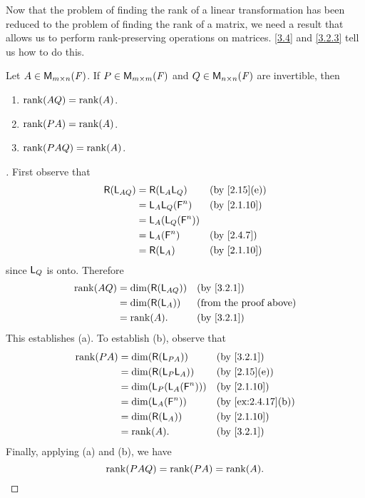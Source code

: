 \begin{note}
	Now that the problem of finding the rank of a linear transformation has been reduced to the problem of finding the rank of a matrix, we need a result that allows us to perform rank-preserving operations on matrices.
	\cref{3.4} and \cref{3.2.3} tell us how to do this.
\end{note}

\begin{thm}\label{3.4}
	Let \(A \in \mathsf{M}_{{m} \times n}({\mathit{F}})\).
	If \(P \in \mathsf{M}_{{m} \times m}({\mathit{F}})\) and \(Q \in \mathsf{M}_{{n} \times n}({\mathit{F}})\) are invertible, then
	\begin{enumerate}
		\item \(\rk{AQ} = \rk{A}\).
		\item \(\rk{PA} = \rk{A}\).
		\item \(\rk{PAQ} = \rk{A}\).
	\end{enumerate}
\end{thm}

\begin{proof}[]
	First observe that
	\begin{align*}
		\rg{\L_{AQ}} & = \rg{\L_A \L_Q}       &  & \by{2.15}[e] \\
		             & = \L_A \L_Q(\vs{F}^n)  &  & \by{2.1.10}  \\
		             & = \L_A(\L_Q(\vs{F}^n))                   \\
		             & = \L_A(\vs{F}^n)       &  & \by{2.4.7}   \\
		             & = \rg{\L_A}            &  & \by{2.1.10}
	\end{align*}
	since \(\mathsf{L}_Q\) is onto.
	Therefore
	\begin{align*}
		\rk{AQ} & = \dim(\rg{\L_{AQ}}) &  & \by{3.2.1}                    \\
		        & = \dim(\rg{\L_A})    &  & \text{(from the proof above)} \\
		        & = \rk{A}.            &  & \by{3.2.1}
	\end{align*}
	This establishes (a).
	To establish (b), observe that
	\begin{align*}
		\rk{PA} & = \dim(\rg{\L_{PA}})         &  & \by{3.2.1}        \\
		        & = \dim(\rg{\L_P \L_A})       &  & \by{2.15}[e]      \\
		        & = \dim(\L_P(\L_A(\vs{F}^n))) &  & \by{2.1.10}       \\
		        & = \dim(\L_A(\vs{F}^n))       &  & \by{ex:2.4.17}[b] \\
		        & = \dim(\rg{\L_A})            &  & \by{2.1.10}       \\
		        & = \rk{A}.                    &  & \by{3.2.1}
	\end{align*}
	Finally, applying (a) and (b), we have
	\[
		\rk{PAQ} = \rk{PA} = \rk{A}.
	\]
\end{proof}

